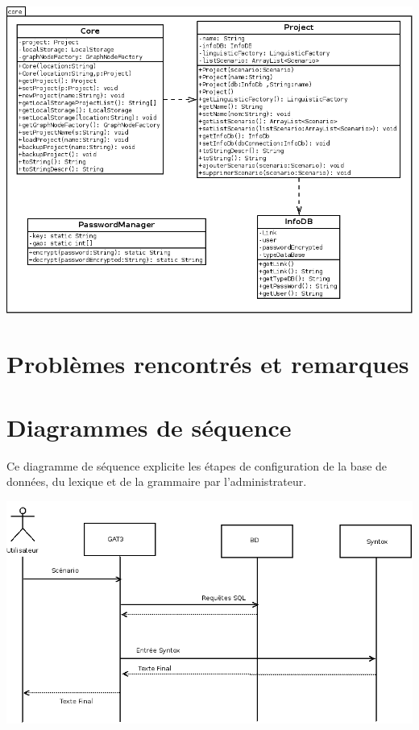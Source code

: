 \documentclass[12pt]{report}
\begin{document}
\begin{center}
\includegraphics[scale=0.5]{diversuml/Core.png}
\end{center}

\section{Problèmes rencontrés et remarques}

\section{Diagrammes de séquence}
	Ce diagramme de séquence explicite les étapes de configuration de la base de données, du lexique et de la grammaire par l'administrateur. 

	\includegraphics[scale=0.4]{diasequence2.png}
\end{document}
